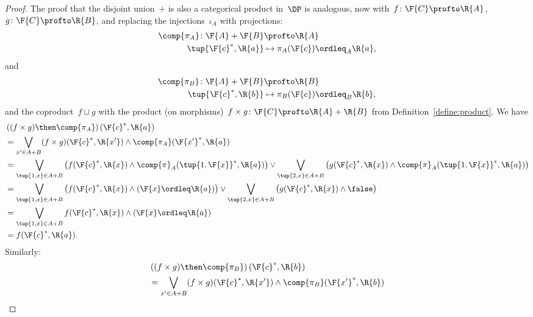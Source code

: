 \begin{proof}
  The proof that the disjoint union~$+$ is also a categorical product in~$\DP$ is analogous, now with~$f \colon \F{C} \profto \R{A}$,~$g \colon \F{C} \profto \R{B}$, and replacing the injections~$\iota_A$ with projections:
  \begin{equation}
    \begin{aligned}
      \comp{\pi_A} \colon \F{A}+\F{B} &\profto \R{A}\\
      \tup{\F{c}^*,\R{a}}&\mapsto \pi_A(\F{c})\ordleq_A \R{a},
    \end{aligned}
  \end{equation}
  and
  \begin{equation}
    \begin{aligned}
      \comp{\pi_B} \colon \F{A}+\F{B} &\profto \R{B}\\
      \tup{\F{c}^*,\R{b}}&\mapsto \pi_B(\F{c})\ordleq_B \R{b},
    \end{aligned}
  \end{equation}
  and the coproduct~$f \sqcup g$ with the product (on morphisms)~$f \times g \colon \F{C} \profto \R{A} + \R{B}$ from Definition~\ref{define:product}. We have
  \begin{equation}
    \begin{aligned}
      &\left((f\times g)\then \comp{\pi_A}\right)(\F{c}^*,\R{a})\\
      &=\bigvee_{x'\in A+B} (f\times g)(\F{c}^*,\R{x'}) \wedge \comp{\pi_A}(\F{x'}^*,\R{a})\\
      &=\bigvee_{\tup{1,x}\in A+B}\left( f(\F{c}^*,\R{x}) \wedge \comp{\pi}_A(\tup{1,\F{x}}^*,\R{a})\right) \vee
      \bigvee_{\tup{2,x}\in A+B}\left( g(\F{c}^*,\R{x}) \wedge \comp{\pi}_A(\tup{1,\F{x}}^*,\R{a})\right)\\
      &=\bigvee_{\tup{1,x}\in A+B}\left( f(\F{c}^*,\R{x}) \wedge (\F{x}\ordleq \R{a})\right) \vee
      \bigvee_{\tup{2,x}\in A+B}\left( g(\F{c}^*,\R{x}) \wedge \false \right)\\
      &=\bigvee_{\tup{1,x}\in A+B} f(\F{c}^*,\R{x}) \wedge (\F{x}\ordleq \R{a})\\
      &=f(\F{c}^*,\R{a}).
    \end{aligned}
  \end{equation}
  Similarly:
  \begin{equation}
    \begin{aligned}
      &\left((f\times g)\then \comp{\pi_B}\right)(\F{c}^*,\R{b})\\
      &=\bigvee_{x'\in A+B} (f\times g)(\F{c}^*,\R{x'}) \wedge \comp{\pi_B}(\F{x'}^*,\R{b})\\

\end{aligned}
\end{equation}
\end{proof}
